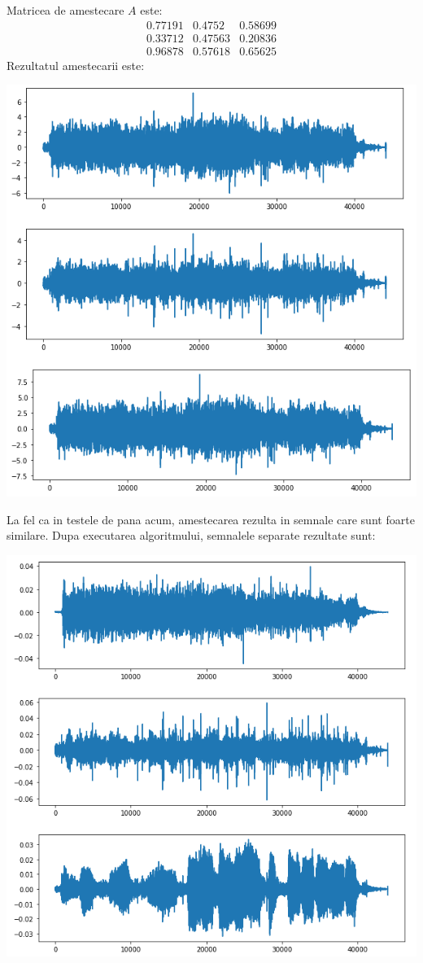 \documentclass[12pt,oneside]{article}
\begin{document}
 Matricea de amestecare $A$ este:
\[
 \begin{matrix}
	0.77191 & 0.4752 &  0.58699 \\
	0.33712 & 0.47563 & 0.20836 \\
	0.96878 & 0.57618 & 0.65625
 \end{matrix}
\]
Rezultatul amestecarii este:
\begin{center}
	\includegraphics[scale=1]{three_mixed}
 \end{center}

 La fel ca in testele de pana acum, amestecarea rezulta in semnale care sunt foarte similare. Dupa executarea algoritmului, semnalele separate rezultate sunt:
\begin{center}
	\includegraphics[scale=1]{three_separated}
 \end{center}
\end{document}
